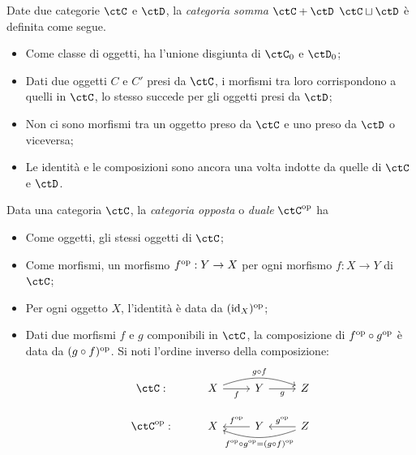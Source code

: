 \begin{definition}\label{def_cat_somma}
	Date due categorie \(\ctC\) e \(\ctD\), la \emph{categoria somma} \(\ctC+\ctD\) \(\ctC\sqcup\ctD\) è definita come segue.
	\begin{itemize}
		\item Come classe di oggetti,  ha l'unione disgiunta di \(\ctC_0\) e \(\ctD_0\);
		\item Dati due oggetti \(C\) e \(C'\) presi da \(\ctC\), i morfismi tra loro corrispondono a quelli in \(\ctC\), lo stesso succede per gli oggetti presi da \(\ctD\);
		\item Non ci sono morfismi tra un oggetto preso da \(\ctC\) e uno preso da \(\ctD\) o viceversa;
		\item Le identità e le composizioni sono ancora una volta indotte da quelle di \(\ctC\) e \(\ctD\).
	\end{itemize}
\end{definition}


\begin{definition}\label{def_cat_opp}
	Data una categoria \(\ctC\), la \emph{categoria opposta} o \emph{duale} \(\ctC^\op\) ha
	\begin{itemize}
		\item Come oggetti, gli stessi oggetti di \(\ctC\);
		\item Come morfismi, un morfismo \(f^{\text{op}}:Y\to X\) per ogni morfismo \(f:X\to Y\) di \(\ctC\);
		\item Per ogni oggetto \(X\), l'identità è data da \((\mathrm{id}_X)^{\text{op}}\);
		\item Dati due morfismi \(f\) e \(g\) componibili in \(\ctC\), la composizione di \(f^{\text{op}}\circ g^{\text{op}}\) è data da \((g\circ f)^{\text{op}}\). Si noti l'ordine inverso della composizione:
		\[
		\begin{tikzcd}
			\ctC: & X \ar{r}[swap]{f} \ar[bend left=20]{rr}{g\circ f} & Y \ar{r}[swap]{g} & Z \\
			\ctC^\op: &X & Y  \ar{l}[swap]{f^\op} & Z \ar{l}[swap]{g^\op} \ar[bend left=20]{ll}{f^\op\circ g^\op=(g\circ f)^\op}
		\end{tikzcd}
		\]
	\end{itemize}
\end{definition}

